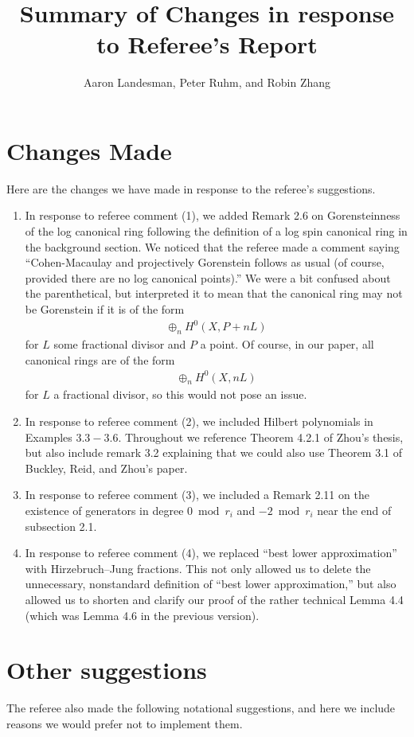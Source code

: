\documentclass[10 pt]{amsart}
\title{Summary of Changes in response to Referee's Report}
\author{Aaron Landesman, Peter Ruhm, and Robin Zhang}
\theoremstyle{plain}
\theoremstyle{definition}
\theoremstyle{remark}
\numberwithin{equation}{section}
\begin{document}
\maketitle
\section{Changes Made}
Here are the changes we have made in response to the referee's suggestions.

\begin{enumerate}
	\item In response to referee comment (1), we added Remark 2.6 on Gorensteinness of the log canonical ring following
	the definition of a log spin canonical ring in the background section.
	We noticed that the referee made a comment saying
	``Cohen-Macaulay and
projectively Gorenstein follows as usual (of course, provided there are
no log canonical points).'' We were a bit confused about the parenthetical, but interpreted
it to mean that the canonical ring may not be Gorenstein if it is of the form
\begin{align*}
	\oplus_n H^0(X, P + n L)
\end{align*}
for $L$ some fractional divisor and $P$ a point. Of course, in our paper, all canonical rings are of the form
\begin{align*}
	\oplus_n H^0(X, n L)
\end{align*}
for $L$ a fractional divisor, so this would not pose an issue.
	\item In response to referee comment (2), we included Hilbert polynomials in Examples $3.3- 3.6$.
		Throughout we reference Theorem 4.2.1 of Zhou's thesis,
		but also include remark 3.2 explaining that we could also use
		Theorem 3.1 of Buckley, Reid, and Zhou's paper.
	\item In response to referee comment (3), we included a Remark 2.11 on the existence of generators in degree $0 \bmod r_i$
		and $-2 \bmod r_i$ near the end of subsection 2.1.
	\item In response to referee comment (4), we replaced ``best lower approximation'' with Hirzebruch--Jung
		fractions. This not only allowed us to delete the unnecessary, nonstandard definition
		of ``best lower approximation,''
		but also allowed us to shorten and
		clarify our proof of the rather
		technical Lemma 4.4 (which was
		Lemma 4.6 in the previous version).
\end{enumerate}


\section{Other suggestions}
The referee also made the following notational suggestions,
and here we include reasons we would prefer not to implement them.
\end{document}
